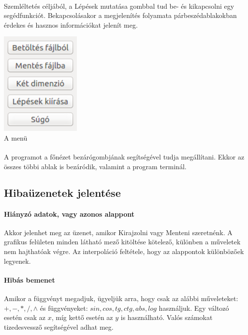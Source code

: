 \documentclass[12pt]{report}
\begin{document}
\paragraph{}
Szemléltetés céljából, a Lépések mutatása gombbal tud be- és kikapcsolni egy segédfunkciót. Bekapcsolásakor a megjelenítés folyamata párbeszédablakokban érdekes és hasznos információkat jelenít meg.
\begin{center}
\includegraphics[width=4cm]{pics/gui/menu}  \\
{\footnotesize A menü} 
\end{center}
\paragraph{}
A programot a főnézet bezárógombjának segítségével tudja megállítani. Ekkor az összes többi ablak is bezáródik, valamint a program terminál.

\subsection{Hibaüzenetek jelentése}
\paragraph{Hiányzó adatok, vagy azonos alappont}
Akkor jelenhet meg az üzenet, amikor Kirajzolni vagy Menteni szeretnénk. A grafikus felületen minden látható mező kitöltése kötelező, különben a műveletek nem hajthatóak végre. Az interpoláció feltétele, hogy az alappontok különbözőek legyenek.

\paragraph{Hibás bemenet}
Amikor a függvényt megadjuk, ügyeljük arra, hogy csak az alábbi műveleteket: $+,-,*,/,\wedge$ és függvényeket: $sin, cos, tg, ctg, abs, log$ használjuk. Egy változó esetén csak az $x$, míg kettő esetén az $y$ is használható. Valós számokat tizedesvessző segítségével adhat meg.
\end{document}
